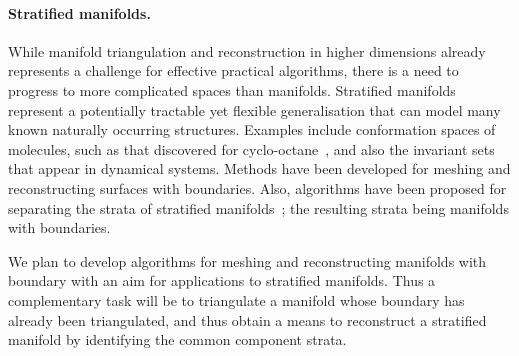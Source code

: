 \paragraph{Stratified manifolds.}

While manifold triangulation and reconstruction in higher dimensions
already represents a challenge for effective practical algorithms,
there is a need to progress to more complicated spaces than
manifolds. Stratified manifolds represent a potentially tractable yet
flexible generalisation that can model many known naturally occurring
structures. Examples include conformation spaces of molecules, such as
that discovered for cyclo-octane~\cite{mtcw-tco-2010}, and also the invariant sets that
appear in dynamical systems.
%
Methods have been developed for meshing and reconstructing surfaces
with boundaries. Also, algorithms have been proposed for separating
the strata of stratified manifolds~\cite{bendich2007}; the resulting
strata being manifolds with boundaries. 

We plan to develop algorithms for meshing and reconstructing manifolds
with boundary with an aim for applications to stratified
manifolds. Thus a complementary task will be to triangulate a manifold
whose boundary has already been triangulated, and thus obtain a means
to reconstruct a stratified manifold by identifying the common
component strata. 